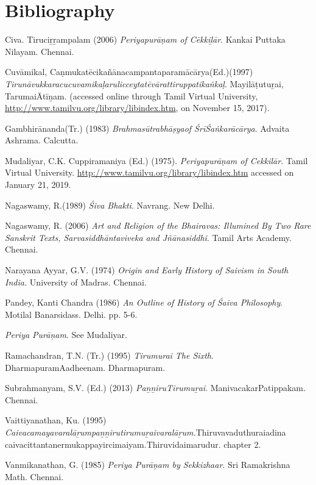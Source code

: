 \section*{Bibliography}

\begin{thebibliography}{99}
 Civa. Tiruciṟṟampalam (2006) \textit{Periyapurāṇam of Cēkkiḻār}. Kankai Puttaka Nilayam. Chennai.

  Cuvāmikal, Caṇmukatēcikañānacampantaparamācārya(Ed.)(1997) \textit{Tirunāvukkaracucuvamikaḷarulicceytatēvārattiruppatikaṅkaḷ}. Mayilāṭutuṟai, TarumaiĀtīṉam. (accessed online through Tamil Virtual University, \url{http://www.tamilvu.org/library/libindex.htm}, on November 15, 2017).

  Gambhirānanda(Tr.) (1983) \textit{Brahmasūtrabhāṣyaof ŚrīŚaṅkarācārya}. Advaita Ashrama. Calcutta.

  Mudaliyar, C.K. Cuppiramaniya (Ed.) (1975). \textit{Periyapurāṇam of Cekkilār. }Tamil Virtual University. \url{ http://www.tamilvu.org/library/libindex.htm} accessed on January 21, 2019.

  Nagaswamy, R.(1989) \textit{Śiva Bhakti}. Navrang. New Delhi.

  Nagaswamy, R. (2006) \textit{Art and Religion of the Bhairavas: Illumined By Two Rare Sanskrit Texts, Sarvasiddhāntaviveka and Jñānasiddhi}. Tamil Arts Academy. Chennai.

  Narayana Ayyar, G.V. (1974) \textit{Origin and Early History of Saivism in South India.} University of Madras. Chennai.

  Pandey, Kanti Chandra (1986) \textit{An Outline of History of Śaiva Philosophy}. Motilal Banarsidass. Delhi. pp. 5-6.

  \textit{Periya Purāņam}. See Mudaliyar.

  Ramachandran, T.N. (Tr.) (1995) \textit{Tirumurai The Sixth}. DharmapuramAadheenam. Dharmapuram.

  Subrahmanyam, S.V. (Ed.) (2013) \textit{PaṉṉiruTirumuṟai}. ManivacakarPatippakam. Chennai.

  Vaittiyanathan, Ku. (1995) \textit{Caivacamayavaralāṟumpaṉṉirutirumuṟaivaralāṟum.}Thiruvavaduthuraiadina caivacittantanermukappayircimaiyam.Thiruvidaimarudur. chapter 2.

  Vanmikanathan, G. (1985) \textit{Periya Purāņam by Sekkizhaar}. Sri Ramakrishna Math. Chennai.

 \end{thebibliography}


